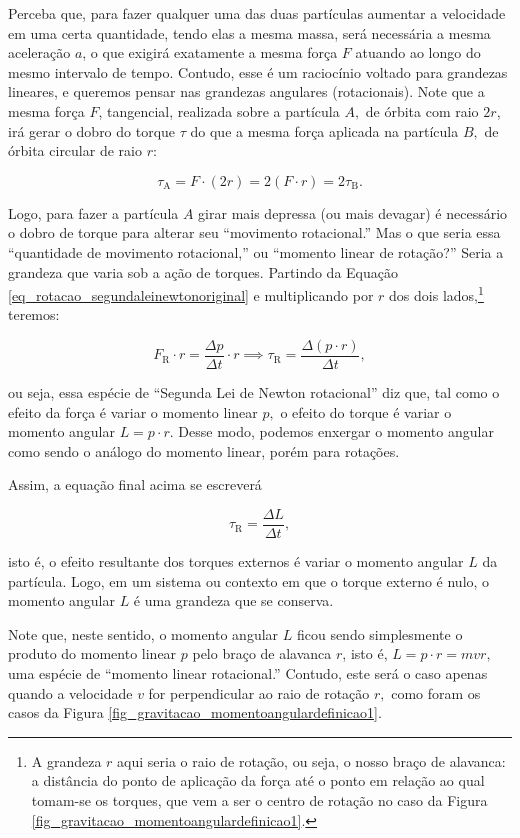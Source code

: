 Perceba que, para fazer qualquer uma das duas partículas aumentar a velocidade em uma certa quantidade, tendo elas a mesma massa, será necessária a mesma aceleração $a$, o que exigirá exatamente a mesma força $F$ atuando ao longo do mesmo intervalo de tempo. Contudo, esse é um raciocínio voltado para grandezas lineares, e queremos pensar nas grandezas angulares (rotacionais). Note que a mesma força $F$, tangencial, realizada sobre a partícula $A,$ de órbita com raio $2r$, irá gerar o dobro do torque $\tau$ do que a mesma força aplicada na partícula $B,$ de órbita circular de raio $r$:

$$ \tau_\text{A} = F \cdot (2r) = 2 (F \cdot r) = 2 \tau_\text{B}.$$
 
Logo, para fazer a partícula $A$ girar mais depressa (ou mais devagar) é necessário o dobro de torque para alterar seu ``movimento rotacional.'' Mas o que seria essa ``quantidade de movimento rotacional,'' ou ``momento linear de rotação?'' Seria a grandeza que varia sob a ação de torques. Partindo da Equação \eqref{eq_rotacao_segundaleinewtonoriginal} e multiplicando por $r$ dos dois lados,\footnote{A grandeza $r$ aqui seria o raio de rotação, ou seja, o nosso braço de alavanca: a distância do ponto de aplicação da força até o ponto em relação ao qual tomam-se os torques, que vem a ser o centro de rotação no caso da Figura \ref{fig_gravitacao_momentoangulardefinicao1}.} teremos:

$$ F_\text{R} \cdot r = \dfrac{\Delta p}{\Delta t} \cdot r  \implies \tau_\text{R} = \dfrac{\Delta (p \cdot r)}{\Delta t},$$

\noindent ou seja, essa espécie de ``Segunda Lei de Newton rotacional'' diz que, tal como o efeito da força é variar o momento linear $p,$ o efeito do torque é variar o momento angular $L=p\cdot r.$ Desse modo, podemos enxergar o momento angular como sendo o análogo do momento linear, porém para rotações.

Assim, a equação final acima se escreverá

$$ \tau_\text{R} = \dfrac{\Delta L}{\Delta t},$$

\noindent isto é, o efeito resultante dos torques externos é variar o momento angular $L$ da partícula. Logo, em um sistema ou contexto em que o torque externo é nulo, o momento angular $L$ é uma grandeza que se conserva.

Note que, neste sentido, o momento angular $L$ ficou sendo simplesmente o produto do momento linear $p$ pelo braço de alavanca $r$, isto é, $L= p \cdot r = mvr,$ uma espécie de ``momento linear rotacional.'' Contudo, este será o caso apenas quando a velocidade $v$ for perpendicular ao raio de rotação $r,$ como foram os casos da Figura \ref{fig_gravitacao_momentoangulardefinicao1}.

